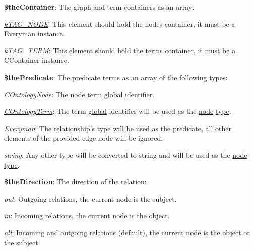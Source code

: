 \begin{DoxyItemize}
\item {\bfseries \$the\-Container}\-: The graph and term containers as an array\-: 
\begin{DoxyItemize}
\item {\itshape \hyperlink{}{k\-T\-A\-G\-\_\-\-N\-O\-D\-E}}\-: This element should hold the nodes container, it must be a Everyman instance. 
\item {\itshape \hyperlink{}{k\-T\-A\-G\-\_\-\-T\-E\-R\-M}}\-: This element should hold the terms container, it must be a \hyperlink{class_c_container}{C\-Container} instance. 
\end{DoxyItemize}
\item {\bfseries \$the\-Predicate}\-: The predicate terms as an array of the following types\-: 
\begin{DoxyItemize}
\item {\itshape \hyperlink{class_c_ontology_node}{C\-Ontology\-Node}}\-: The node \hyperlink{class_c_ontology_node_a2f294a9c93079f58190cedbdd0c09068}{term} \hyperlink{}{global} \hyperlink{class_c_ontology_term_object_ab1a4d21bb56a8a6cf3f77f595d776267}{identifier}. 
\item {\itshape \hyperlink{class_c_ontology_term}{C\-Ontology\-Term}}\-: The term \hyperlink{}{global} identifier will be used as the \hyperlink{class_c_ontology_edge}{node} \hyperlink{class_c_graph_edge_a584c0263fd773ffb764385a51d36caf2}{type}. 
\item {\itshape Everyman}\-: The relationship's type will be used as the predicate, all other elements of the provided edge node will be ignored. 
\item {\itshape string}\-: Any other type will be converted to string and will be used as the \hyperlink{class_c_ontology_edge}{node} \hyperlink{class_c_graph_edge_a584c0263fd773ffb764385a51d36caf2}{type}. 
\end{DoxyItemize}
\item {\bfseries \$the\-Direction}\-: The direction of the relation\-: 
\begin{DoxyItemize}
\item {\itshape out}\-: Outgoing relations, the current node is the subject. 
\item {\itshape in}\-: Incoming relations, the current node is the object. 
\item {\itshape all}\-: Incoming and outgoing relations (default), the current node is the object or the subject. 
\end{DoxyItemize}
\end{DoxyItemize}


